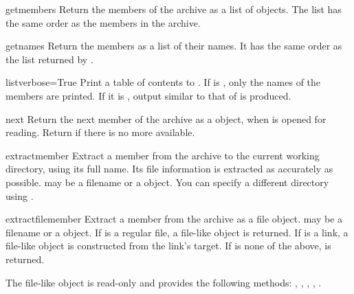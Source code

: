 \begin{methoddesc}{getmembers}{}
    Return the members of the archive as a list of  objects.
    The list has the same order as the members in the archive.
\end{methoddesc}

\begin{methoddesc}{getnames}{}
    Return the members as a list of their names. It has the same order as
    the list returned by .
\end{methoddesc}

\begin{methoddesc}{list}{verbose=True}
    Print a table of contents to . If  is
    , only the names of the members are printed. If it is
    , output similar to that of  is produced.
\end{methoddesc}

\begin{methoddesc}{next}{}
    Return the next member of the archive as a  object, when
     is opened for reading. Return  if there is no
    more available.
\end{methoddesc}

\begin{methoddesc}{extract}{member}
    Extract a member from the archive to the current working directory,
    using its full name. Its file information is extracted as accurately as
    possible.
     may be a filename or a  object.
    You can specify a different directory using .
\end{methoddesc}

\begin{methoddesc}{extractfile}{member}
    Extract a member from the archive as a file object.
     may be a filename or a  object.
    If  is a regular file, a file-like object is returned.
    If  is a link, a file-like object is constructed from the
    link's target.
    If  is none of the above,  is returned.
    \begin{notice}
        The file-like object is read-only and provides the following methods:
        , , ,
        , .
    \end{notice}
\end{methoddesc}

